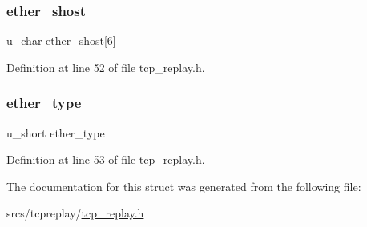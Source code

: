 \mbox{\label{structsniff__ethernet_a8ca4d06502ca0f15b6458344d58c4325}} 
\subsubsection{\texorpdfstring{ether\+\_\+shost}{ether\_shost}}
{\footnotesize\ttfamily u\+\_\+char ether\+\_\+shost\mbox{[}6\mbox{]}}



Definition at line 52 of file tcp\+\_\+replay.\+h.

\mbox{\label{structsniff__ethernet_ab36efdcd906c499f7348cfe71081a17f}} 
\subsubsection{\texorpdfstring{ether\+\_\+type}{ether\_type}}
{\footnotesize\ttfamily u\+\_\+short ether\+\_\+type}



Definition at line 53 of file tcp\+\_\+replay.\+h.



The documentation for this struct was generated from the following file\+:\begin{DoxyCompactItemize}
\item 
srcs/tcpreplay/\hyperlink{tcp__replay_8h}{tcp\+\_\+replay.\+h}\end{DoxyCompactItemize}
